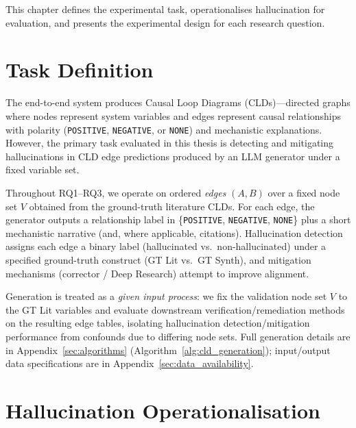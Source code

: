 This chapter defines the experimental task, operationalises hallucination for evaluation, and presents the experimental design for each research question.

\section{Task Definition}
\label{sec:task_definition}
\label{sec:problem_setup} %
\label{sec:task_cld_hallucination_detection}
\label{sec:task_cld_generation}

The end-to-end system produces Causal Loop Diagrams (CLDs)---directed graphs where nodes represent system variables and edges represent causal relationships with polarity (\texttt{POSITIVE}, \texttt{NEGATIVE}, or \texttt{NONE}) and mechanistic explanations. However, the primary task evaluated in this thesis is detecting and mitigating hallucinations in CLD edge predictions produced by an LLM generator under a fixed variable set.

Throughout RQ1--RQ3, we operate on ordered \emph{edges} \((A,B)\) over a fixed node set \(V\) obtained from the ground-truth literature CLDs. For each edge, the generator outputs a relationship label in \{\texttt{POSITIVE}, \texttt{NEGATIVE}, \texttt{NONE}\} plus a short mechanistic narrative (and, where applicable, citations). Hallucination detection assigns each edge a binary label (hallucinated vs.\ non-hallucinated) under a specified ground-truth construct (GT Lit vs.\ GT Synth), and mitigation mechanisms (corrector / Deep Research) attempt to improve alignment.

Generation is treated as a \emph{given input process}: we fix the validation node set \(V\) to the GT Lit variables and evaluate downstream verification/remediation methods on the resulting edge tables, isolating hallucination detection/mitigation performance from confounds due to differing node sets. Full generation details are in Appendix~\ref{sec:algorithms} (Algorithm~\ref{alg:cld_generation}); input/output data specifications are in Appendix~\ref{sec:data_availability}.

\section{Hallucination Operationalisation}
\label{sec:hallucination_operationalisation}
\label{sec:hallucination_definition} %

